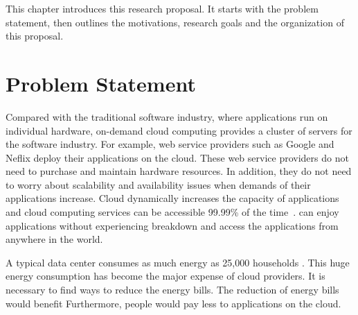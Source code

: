 This chapter introduces this research proposal. It starts with the problem statement, then outlines the motivations, research goals and the organization of this proposal.

\section{Problem Statement}
\label{sec:statement}
 Compared with the traditional software industry, where applications run
on individual hardware, on-demand cloud computing provides a cluster of servers for the software industry. For example, 
web service providers such as Google and Neflix deploy their applications on the cloud. These web service providers 
do not need to purchase and maintain hardware resources. 
In addition, they do not need to worry 
about scalability and availability issues when demands of their applications increase. Cloud dynamically increases the capacity of applications and cloud computing services can be accessible 99.99\% of the time~\cite{adhikari:2012uq}.
 can enjoy applications without experiencing breakdown and access the applications from anywhere in the world.

A typical data center consumes as much energy as 25,000 households \cite{dayarathna:2016ua}. 
This huge energy consumption has become the major expense of cloud providers. It is necessary to find ways to reduce the energy bills. 
The reduction of energy bills would benefit  
Furthermore, people would pay less to applications on the cloud. 

